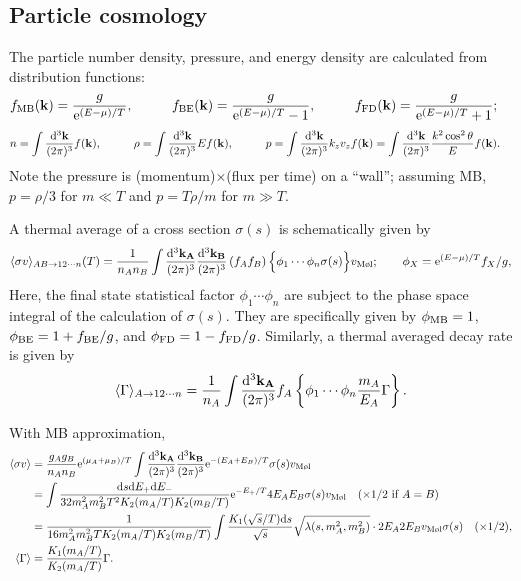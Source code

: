 \documentclass[CheatSheet]{subfiles}
\begin{document}
\subsection{Particle cosmology}
The particle number density, pressure, and energy density are calculated from distribution functions:
\begin{alignat}{3}
 f\w{MB}(\vc k)&=\frac{g}{\ee^{(E-\mu)/T}},\qquad&
 f\w{BE}(\vc k)&=\frac{g}{\ee^{(E-\mu)/T}-1},\qquad&
 f\w{FD}(\vc k)&=\frac{g}{\ee^{(E-\mu)/T}+1};
\end{alignat}
\begin{alignat}{3}
 n   &=\int\ddP{k}f(\vc k),\qquad&
 \rho&=\int\ddP{k}Ef(\vc k),\qquad&
 p   &=\int\ddP{k}k_zv_z f(\vc k)
      =\int\ddP{k}\frac{k^2\cos^2\theta}{E} f(\vc k).
\end{alignat}
Note the pressure is (momentum)$\times$(flux per time) on a ``wall''; assuming MB, $p=\rho/3$ for $m\ll T$ and $p=T\rho/m$ for $m\gg T$.

A thermal average of a cross section $\sigma(s)$ is schematically given by
\begin{equation}
 \mean{\sigma v}_{AB\to12\cdots n}(T)
=\frac{1}{n_An_B}\int\ddP{k_A}\ddP{k_B}\left(
f_A f_B\right)\Bigl\{\phi_1 \cdots \phi_n\sigma(s)\Bigr\}
v_{\text{M\o l}};\qquad \phi_X = \ee^{(E-\mu)/T}f_X/g,
\end{equation}
Here, the final state statistical factor $\phi_1\cdots\phi_n$ are subject to the phase space integral of the calculation of $\sigma(s)$. They are specifically given by $\phi\w{MB}=1$, $\phi\w{BE}=1+f\w{BE}/g$, and $\phi\w{FD}=1-f\w{FD}/g$.
Similarly, a thermal averaged decay rate is given by
\begin{equation}
 \mean{\Gamma}_{A\to12\cdots n}
=\frac{1}{n_A}\int\ddP{k_A}
f_A \left\{\phi_1 \cdots \phi_n
\frac{m_A}{E_A}\Gamma\right\}.
\end{equation}


With MB approximation,
\begin{align}
 \mean{\sigma v}
&=
\frac{g_Ag_B}{n_An_B}
\ee^{(\mu_A+\mu_B)/T}
\int\ddP{k_A}\ddP{k_B}
\ee^{-(E_A+E_B)/T}
\sigma(s)v_{\text{M\o l}}
\\
&=
\int\frac{\dd s\dd E_+ \dd E_-}{32m_A^2 m_B^2 T^2 K_2(m_A/T)K_2(m_B/T)}
\ee^{-E_+/T}
4E_AE_B\sigma(s)v_{\text{M\o l}}\quad(\text{$\times1/2$ if $A=B$)}
\\
&=
\frac{1}{16m_A^2 m_B^2 T K_2(m_A/T)K_2(m_B/T)}
\int
\frac{K_1(\sqrt{s}/T) \dd s}{\sqrt{s}}
\sqrt{\Kallen(s,m_A^2,m_B^2)}
\cdot2E_A2E_Bv_{\text{M\o l}}\sigma(s)
\quad(\times1/2),
\\
 \mean{\Gamma}
 &=\frac{K_1(m_A/T)}{K_2(m_A/T)}\Gamma.
\end{align}
\end{document}
